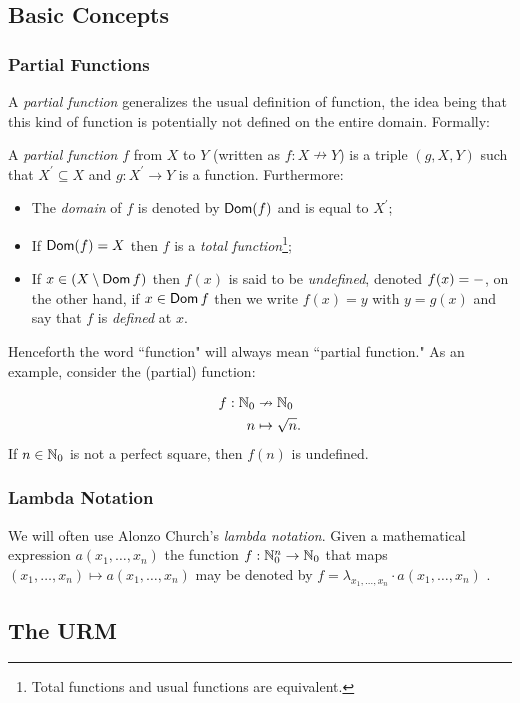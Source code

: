 \subsection{Basic Concepts}
\subsubsection*{Partial Functions}
A \emph{partial function} generalizes the usual definition of function, the idea being that this kind of function is potentially not defined on the entire domain. Formally:
\begin{definition}
	A \emph{partial function} $f$ from $X$ to $Y$ (written as $f : X \nrightarrow Y$)  is a triple $(g,X,Y)$ such that $X^\prime \subseteq X$ and $g:X^\prime \to Y$ is a function. Furthermore:
	\begin{itemize}
	 \item 
		The \emph{domain} of $f$ is denoted by $\operatorname{\mathsf{Dom}}(f)$ and is equal to $X^\prime$; 
	 \item
		 If $ \operatorname{\mathsf{Dom}}(f) = X$ then $f$ is a \emph{total function}\footnote{Total functions and usual functions are equivalent.};
	 \item
		 If $x \in (X \setminus \operatorname{\mathsf{Dom}} f)$ then $f(x)$ is said to be \emph{undefined}, denoted $f(x) = \--$, on the other hand, if $x \in \operatorname{\mathsf{Dom}} f$ then we write $f(x) = y$ with $y = g(x)$ and say that $f$ is \emph{defined} at $x$.  
 \end{itemize}
\end{definition}
Henceforth the word ``function" will always mean ``partial function."  As an example, consider the (partial) function:

\begin{align*}
	f : \mathbb{N}_0  & \nrightarrow  \mathbb{N}_0 \\
		n  & \mapsto       \sqrt n.
\end{align*}
If $n \in \mathbb{N}_0$ is not a perfect square, then $f(n)$ is undefined. 

\subsubsection*{Lambda Notation}
We will often use Alonzo Church's \emph{lambda notation}. Given a mathematical expression $a(x_1, \ldots, x_n)$ the function $f: \mathbb{N}_0^n \to \mathbb{N}_0$ that maps $(x_1, \ldots, x_n) \mapsto a(x_1, \ldots, x_n)$ may be denoted by $f = \lambda_{x_1, \ldots, x_n} \cdot a(x_1, \ldots, x_n)$ .
\subsection{The URM}
